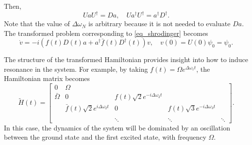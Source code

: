 \documentclass[11pt]{article}
\begin{document}
Then,
\[
UaU^\dag = D a,\quad Ua^\dag U^\dag = a^\dag D^\dag.
\]
Note that the value of $\Delta\omega_N$ is arbitrary because it is not needed to evaluate $D a$.
The transformed problem corresponding to \eqref{eq_shrodinger} becomes 
\begin{equation}
  \dot{v} = -i\left( f(t) D(t) a + a^\dag \bar{f}(t) D^\dag(t) \right)v,\quad v(0) = U(0)\psi_0 = \psi_0.
\end{equation}

The structure of the transformed Hamiltonian provides insight into how to induce resonance in the
system. For example, by taking $f(t)=\Omega e^{\Delta \omega_1 t}$, the Hamiltonian matrix
becomes
\[
\tilde{H}(t) = \begin{bmatrix}
0 & \Omega & & &\\
\bar{\Omega} & 0 & f(t) \sqrt{2} e^{-i\Delta \omega_2 t}& &\\
& \bar{f}(t) \sqrt{2} e^{i\Delta \omega_2 t} & 0 & f(t) \sqrt{3} e^{-i\Delta \omega_3 t}
&\\
\\
& & \ddots & \ddots & \ddots
\end{bmatrix}.
\]
In this case, the dynamics of the system will be dominated by an oscillation between the ground state and the
first excited state, with frequency $\Omega$.
\end{document}
